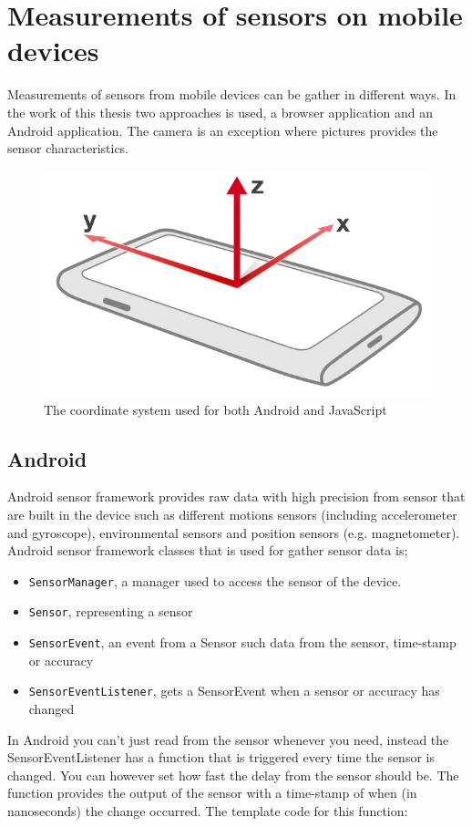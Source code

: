 \section{Measurements of sensors on mobile devices}\label{sec:charMeasureSensor}
Measurements of sensors from mobile devices can be gather in different ways. In the work of this thesis two approaches is used, a browser application and an Android application. The camera is an exception where pictures provides the sensor characteristics.
\begin{figure}[H]
	\centering
    \includegraphics[scale=0.2]{img/device-axes}
    \caption{The coordinate system used for both Android and JavaScript\cite[]{sensor:W3C}}
  \label{fig:device-axes}
\end{figure}

\subsection{Android}\label{subsec:Android}
Android sensor framework provides raw data with high precision from sensor that are built in the device such as different motions sensors (including accelerometer and gyroscope), environmental sensors and position sensors (e.g. magnetometer). \cite[]{android:sensor}
Android sensor framework classes that is used for gather sensor data is; 
\begin{itemize}
	\item[] \texttt{SensorManager}, a manager used to access the sensor of the device. 
	\item[] \texttt{Sensor}, representing a sensor
	\item[] \texttt{SensorEvent}, an event from a Sensor such data from the sensor, time-stamp or accuracy
	\item[] \texttt{SensorEventListener}, gets a SensorEvent when a sensor or accuracy has changed 
\end{itemize}
In Android you can't just read from the sensor whenever you need, instead the SensorEventListener has a function that is triggered every time the sensor is changed. You can however set how fast the delay from the sensor should be. The function provides the output of the sensor with a time-stamp of when (in nanoseconds) the change occurred. The template code for this function:

\cite[]{android:sensorEvent} 




